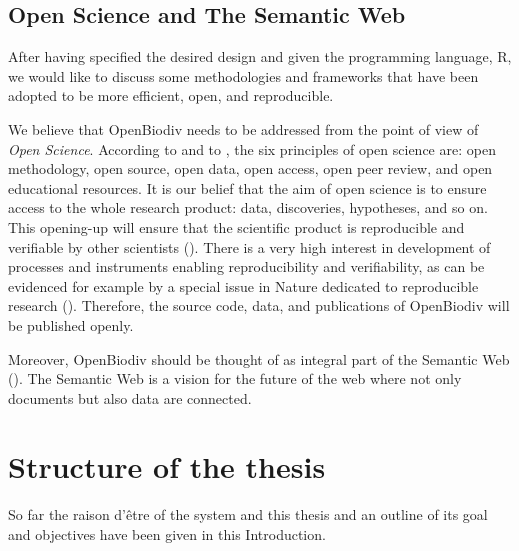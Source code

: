 \subsection*{Open Science and The Semantic Web}

After having specified the desired design and given the programming language, R, we would like to discuss some methodologies and frameworks that have been adopted to be more efficient, open, and reproducible.

We believe that OpenBiodiv needs to be addressed from the point of view of \emph{Open Science}. According to \cite{kraker_case_2011} and to \cite{noauthor_was_nodate}, the six principles of open science are: open methodology, open source, open data, open access, open peer review, and open educational resources. It is our belief that the aim of open science is to ensure access to the whole research product: data, discoveries, hypotheses, and so on. This opening-up will ensure that the scientific product is reproducible and verifiable by other scientists (\cite{mietchen_transformative_2014}). There is a very high interest in development of processes and instruments enabling reproducibility and verifiability, as can be evidenced for example by a special issue in Nature dedicated to reproducible research (\cite{noauthor_challenges_2010}). Therefore, the source code, data, and publications of OpenBiodiv will be published openly.

Moreover, OpenBiodiv should be thought of as integral part of the Semantic Web (\cite{berners-lee_semantic_2001}). The Semantic Web is a vision for the future of the web where not only documents but also data are connected.

\section*{Structure of the thesis}

So far the raison d'\^etre of the system and this thesis and an outline of its goal and objectives have been given in this Introduction.

